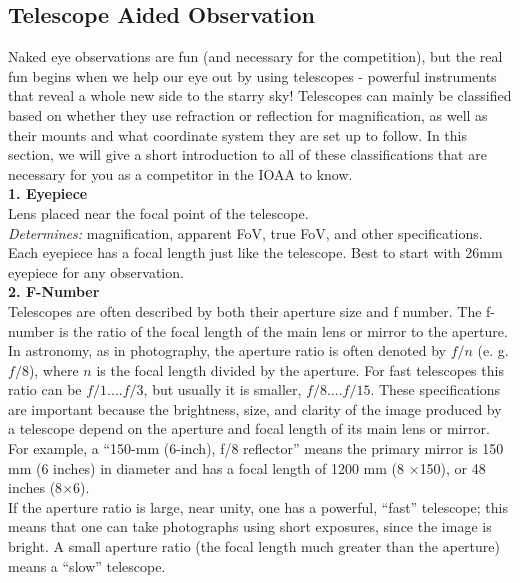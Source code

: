 \documentclass[a4paper,12pt]{extarticle}
\begin{document}
\clearpage
\subsection{Telescope Aided Observation}
Naked eye observations are fun (and necessary for the competition), but the real fun begins when we help our eye out by using telescopes - powerful instruments that reveal a whole new side to the starry sky! Telescopes can mainly be classified based on whether they use refraction or reflection for magnification, as well as their mounts and what coordinate system they are set up to follow. In this section, we will give a short introduction to all of these classifications that are necessary for you as a competitor in the IOAA to know.\\

\textbf{1. Eyepiece}\\ 

Lens placed near the focal point of the telescope.\\
\textit{Determines:} magnification, apparent FoV, true FoV, and other specifications. Each eyepiece has a focal length just like the telescope. Best to start with 26mm eyepiece for any observation.\\


\textbf{2. F-Number}\\ 

Telescopes are often described by both their aperture size and f number. The f-number is the ratio of the focal length of the main lens or mirror to the aperture. In astronomy, as in photography, the aperture ratio is often denoted by $f/n$ (e. g. $f/8$), where $n$ is the focal length divided by the aperture. For fast telescopes this ratio can be $f/1. . . . f/3$, but usually it is smaller, $f/8. . . . f/15$. These specifications are important because the brightness, size, and clarity of the image produced by a telescope depend on the aperture and focal length of its main lens or mirror. For example, a “150-mm (6-inch), f/8 reflector” means the primary mirror is 150 mm (6 inches) in diameter and has a focal length of 1200 mm (8 $\times$150), or 48 inches (8$\times$6).\\

If the aperture ratio is large, near unity, one has a powerful, ``fast'' telescope; this means that one can take photographs using short exposures, since the image is bright. A small aperture ratio (the focal length much greater than the aperture) means a ``slow'' telescope.
\end{document}
